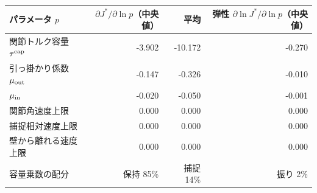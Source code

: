 \begin{tabular}{lrrr}
\toprule
パラメータ $p$ & $\partial J^*/\partial\ln p$（中央値） & 平均 & 弾性 $\partial\ln J^*/\partial\ln p$（中央値） \\
\midrule
関節トルク容量 $\tau^{\rm cap}$ & -3.902 & -10.172 & -0.270 \\
引っ掛かり係数 $\mu_{\rm out}$ & -0.147 & -0.326 & -0.010 \\
$\mu_{\rm in}$ & -0.020 & -0.050 & -0.001 \\
関節角速度上限 & 0.000 & 0.000 & 0.000 \\
捕捉相対速度上限 & 0.000 & 0.000 & 0.000 \\
壁から離れる速度上限 & 0.000 & 0.000 & 0.000 \\
\midrule
容量乗数の配分 & 保持 85\% & 捕捉 14\% & 振り 2\% \\
\bottomrule
\end{tabular}
